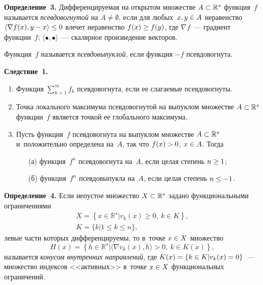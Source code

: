 \begin{multicols}{2}
\smallskip
  
  \noindent
  \textbf{Определение~3.} Дифференцируемая на открытом множестве 
$A\hm\subset \mathbb{R}^s$ функция~$f$ называется \textit{псевдовогнутой} 
на $A\not= \emptyset$, если для любых~$x,y \hm\in A$ неравенство $\langle 
\nabla f(x), y\hm- x\rangle \hm\leq 0$ влечет неравенство $f(x)\hm\geq f(y)$, где 
$\nabla f$~--- градиент функции~$f$; $\langle \bullet,\bullet\rangle$~--- 
скалярное произведение векторов.
  
  Функция~$f$ называется \textit{псевдовыпуклой}, если функция $-f$ 
псевдовогнута.
  \smallskip
  
  \noindent
  \textbf{Следствие~1.} 
  \begin{enumerate}[1.]
  \item  Функция $\sum\nolimits_{k=1}^m f_k$ псевдовогнута, если ее 
слагаемые псевдовогнуты.
  \item  Точка локального максимума псевдовогнутой на выпуклом 
множестве $A\hm\subset \mathbb{R}^s$ функции~$f$ является точкой ее 
глобального максимума.
  \item Пусть функция~$f$ псевдовогнута на выпуклом множестве 
$A\hm\subset \mathbb{R}^s$ и~положительно определена на~$A$, так что 
$f(x)\hm>0$, $x\hm\in A$. Тогда
  \begin{itemize}
  \item[(а)] функция~$f^n$ псевдовогнута на~$A$, если целая степень 
$n\hm\geq 1$;
  \item[(б)] функция~$f^n$ псевдовыпукла на~$A$, если целая степень 
$n\hm\leq -1$.
  \end{itemize}
  \end{enumerate}
  
  \noindent
  \textbf{Определение~4.} Если непустое множество $X\hm\subset 
\mathbb{R}^s$ задано функциональными ограничениями
\begin{multline*}
  X=\left\{ x\in \mathbb{R}^s\vert v_k(x)\geq 0,\ k\in K\right\},\\
  K=\{ k\vert 1\leq k\leq n\},
\end{multline*}
левые части которых дифференцируемы, то в~точке $x\hm\in X$ множество
$$
H(x)=\left\{ h\in \mathbb{R}^s\vert \langle \nabla v_k(x),h\rangle>0, \ k\in 
K(x)\right\},
$$
называется \textit{конусом внутренних направлений}, где $K(x)\hm= \{k\hm\in K\vert 
v_k(x)\hm=0\}$~--- множество индексов <<активных>> в~точке $x\hm\in X$ 
функциональных ограничений.


\end{multicols}
